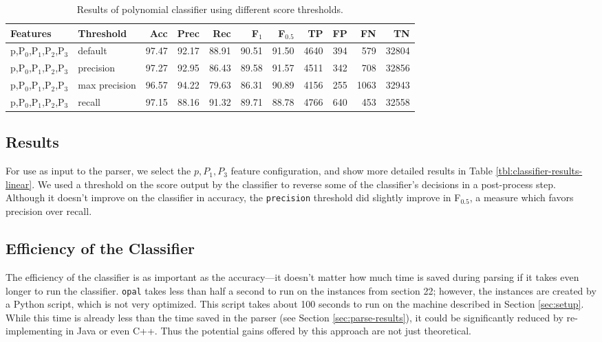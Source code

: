 \documentclass[11pt]{article}
\begin{document}
\begin{table}[htbp]

\begin{tabular}{llrrrrrrrrr}
Features & Threshold & Acc & Prec & Rec & F$_{\text{1}}$ & F$_{\text{0.5}}$ & TP & FP & FN & TN\\
\hline
p,P$_{\text{0}}$,P$_{\text{1}}$,P$_{\text{2}}$,P$_{\text{3}}$ & default & 97.47 & 92.17 & 88.91 & 90.51 & 91.50 & 4640 & 394 & 579 & 32804\\
p,P$_{\text{0}}$,P$_{\text{1}}$,P$_{\text{2}}$,P$_{\text{3}}$ & precision & 97.27 & 92.95 & 86.43 & 89.58 & 91.57 & 4511 & 342 & 708 & 32856\\
p,P$_{\text{0}}$,P$_{\text{1}}$,P$_{\text{2}}$,P$_{\text{3}}$ & max precision & 96.57 & 94.22 & 79.63 & 86.31 & 90.89 & 4156 & 255 & 1063 & 32943\\
p,P$_{\text{0}}$,P$_{\text{1}}$,P$_{\text{2}}$,P$_{\text{3}}$ & recall & 97.15 & 88.16 & 91.32 & 89.71 & 88.78 & 4766 & 640 & 453 & 32558\\
\end{tabular}

\caption{Results of polynomial classifier using different score thresholds.}
\label{tbl:classifier-results-poly}
\end{table}

\subsection{Results}
\label{sec-4-4}

\label{sec:linear-classifier}
For use as input to the parser, we select the $p,P_{1},P_{3}$
feature configuration, and show more detailed results in
Table \ref{tbl:classifier-results-linear}. We used a threshold on the
score output by the classifier to reverse some of the classifier's
decisions in a post-process step. Although it doesn't improve on the
classifier in accuracy, the \texttt{precision} threshold did slightly improve in
F$_{\text{0.5}}$, a measure which favors precision over recall.

\subsection{Efficiency of the Classifier}
\label{sec-4-5}

The efficiency of the classifier is as important as the accuracy---it doesn't
matter how much time is saved during parsing if it takes even longer to run the
classifier. \texttt{opal} takes less than half a second to run on the instances from
section 22; however, the instances are created by a Python script, which is not
very optimized. This script takes about 100 seconds to run on the machine
described in Section \ref{sec:setup}. While this time is already less than the
time saved in the parser (see Section \ref{sec:parse-results}), it could be
significantly reduced by re-implementing in Java or even C++. Thus the potential
gains offered by this approach are not just theoretical.
\end{document}
